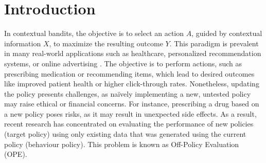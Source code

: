 \section{Introduction} 
In contextual bandits, the objective is to select an action $A$, guided by contextual information $X$, to maximize the resulting outcome $Y$. This paradigm is prevalent in many real-world applications such as healthcare, personalized recommendation systems, or online advertising \citep{li2010contextual, bastani2019online, xu2020contextual}. The objective is to perform actions, such as prescribing medication or recommending items, which lead to desired outcomes like improved patient health or higher click-through rates. Nonetheless, updating the policy presents challenges, as na\"ively implementing a new, untested policy may raise ethical or financial concerns. For instance, prescribing a drug based on a new policy poses risks, as it may result in unexpected side effects. As a result, recent research \citep{swaminathan2015counterfactual, wang2017optimal, farajtabar2018more, su2019continuous, metelli2021subgaussian, liu2019triply, sugiyama2012machine, swaminathan2017off} has concentrated on evaluating the performance of new policies (target policy) using only existing data that was generated using the current policy (behaviour policy). This problem is known as Off-Policy Evaluation (OPE).


